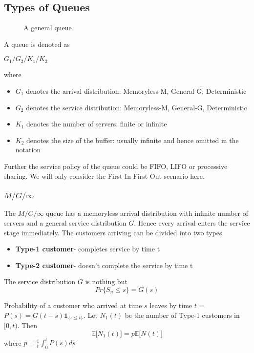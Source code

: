 \documentclass[a4paper,english,12pt]{article}
\begin{document}
\subsection{Types of Queues}
\begin{figure}[hhhh]
	\center
	
	\caption{A general queue}
	\label{Fig:queue}
\end{figure}
\par A queue is denoted as 
\begin{center}
	$G_1/G_2/K_1/K_2$
\end{center}
where\\
\begin{itemize}
	\item $G_1$ denotes the arrival distribution: Memoryless-M, General-G, Deterministic
	\item $G_2$ denotes the service distribution: Memoryless-M, General-G, Deterministic
	\item $K_1$ denotes the number of servers: finite or infinite
	\item $K_2$ denotes the size of the buffer: usually infinite and hence omitted in the notation
\end{itemize}
\par Further the service policy of the queue could be FIFO, LIFO or processive sharing. We will only consider the First In First Out scenario here.

\subsubsection{$M/G/\infty$}
\par The $M/G/\infty$ queue has a memoryless arrival distribution with infinite number of servers and a general service distribution $G$. Hence every arrival enters the service stage immediately. The customers arriving can be divided into two types
\begin{itemize}
	\item \textbf{Type-1 customer}- completes service by time t
	\item \textbf{Type-2 customer}- doesn't complete the service by time t
\end{itemize}
The service distribution $G$ is nothing but
\begin{equation*}
Pr\{S_n\leq s\}=G(s)
\end{equation*}
\par Probability of a customer who arrived at time $s$ leaves by time $t$ =$P(s)=G(t-s)\textbf{1}_{\{s\leq t\}}$. Let $N_1(t)$ be the number of Type-1 customers in $[0,t)$. Then
\begin{equation*}
\mathbb{E}\Big[N_1(t)\Big]=p\mathbb{E}\Big[N(t)\Big]
\end{equation*}
where $p=\frac{1}{t}\int_{0}^{t}P(s)ds$
\end{document}
